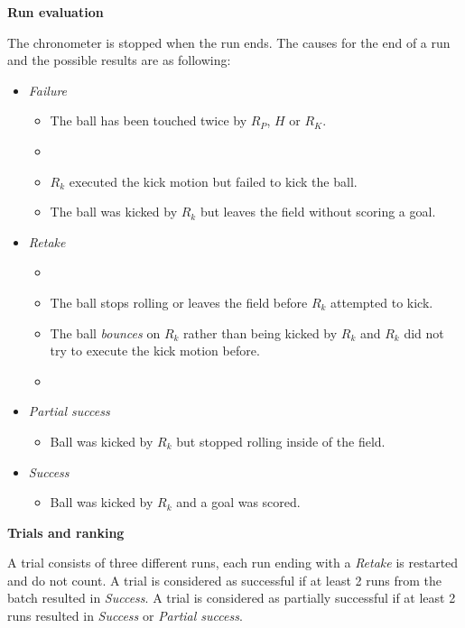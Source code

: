 {\bfseries Run evaluation}

\smallskip

The chronometer is stopped when the run ends. The causes for the end of a run and
the possible results are as following:
\begin{itemize}
\item \textit{Failure}
  \begin{itemize}
    \item The ball has been touched twice by $R_P$, $H$ or $R_K$.
    \item {}
    \item $R_k$ executed the kick motion but failed to kick the ball.
    \item The ball was kicked by $R_k$ but leaves the field without scoring a goal.
  \end{itemize}
\item \textit{Retake}
  \begin{itemize}
    \item {}
    \item The ball stops rolling or leaves the field before $R_k$ attempted to kick.
    \item The ball \emph{bounces} on $R_k$ rather than being kicked by $R_k$ and
          $R_k$ did not try to execute the kick motion before.
    \item {}
  \end{itemize}
\item \textit{Partial success}
  \begin{itemize}
    \item Ball was kicked by $R_k$ but stopped rolling inside of the field.
  \end{itemize}
\item \textit{Success}
  \begin{itemize}
    \item Ball was kicked by $R_k$ and a goal was scored.
  \end{itemize}
\end{itemize}

{\bfseries Trials and ranking}

A trial consists of three different runs, each run ending with a \textit{Retake}
is restarted and do not count. A trial is considered as successful if at least 2
runs from the batch resulted in \textit{Success}. A trial is considered as
partially successful if at least 2 runs resulted in \textit{Success} or \textit{Partial success}.

